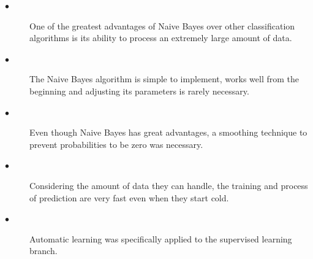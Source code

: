 \documentclass[sigconf,12pt,review=false,natbib=false]{acmart}
\begin{document}
\begin{description}

    \item[$\bullet$] One of the greatest advantages of Naive Bayes over other classification algorithms is its ability
      to process an extremely large amount of data. \\

  \item[$\bullet$] The Naive Bayes algorithm is simple to implement, works well from the beginning and adjusting its
      parameters is rarely necessary. \\

  \item[$\bullet$] Even though Naive Bayes has great advantages, a smoothing technique to prevent probabilities to be
      zero was necessary. \\

  \item[$\bullet$] Considering the amount of data they can handle, the training and process of prediction are very
      fast even when they start cold. \\

  \item[$\bullet$] Automatic learning was specifically applied to the supervised learning branch. \\

\end{description}

\nocite{*}
\printbibliography
\end{document}
